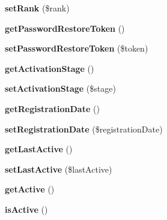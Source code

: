 \begin{DoxyCompactItemize}
\item 
\hypertarget{classUser_a1e1d45603c3b2e91b225e26f3f3f3c20}{
{\bfseries setRank} (\$rank)}
\label{classUser_a1e1d45603c3b2e91b225e26f3f3f3c20}

\item 
\hypertarget{classUser_ab4cbe8a5b71b12a8d712e90e00e38bbe}{
{\bfseries getPasswordRestoreToken} ()}
\label{classUser_ab4cbe8a5b71b12a8d712e90e00e38bbe}

\item 
\hypertarget{classUser_afe28ad4e0c352b5dd96cc15637a1fc16}{
{\bfseries setPasswordRestoreToken} (\$token)}
\label{classUser_afe28ad4e0c352b5dd96cc15637a1fc16}

\item 
\hypertarget{classUser_ae4495a601d73d7ef5d8b200e108dcffc}{
{\bfseries getActivationStage} ()}
\label{classUser_ae4495a601d73d7ef5d8b200e108dcffc}

\item 
\hypertarget{classUser_a0a873176674a02ad6bfbee3acdcd5505}{
{\bfseries setActivationStage} (\$stage)}
\label{classUser_a0a873176674a02ad6bfbee3acdcd5505}

\item 
\hypertarget{classUser_a846956e5cc52189c2f08639895385850}{
{\bfseries getRegistrationDate} ()}
\label{classUser_a846956e5cc52189c2f08639895385850}

\item 
\hypertarget{classUser_a2b691fc0aa620efb3f95899960c2930d}{
{\bfseries setRegistrationDate} (\$registrationDate)}
\label{classUser_a2b691fc0aa620efb3f95899960c2930d}

\item 
\hypertarget{classUser_a48731d70a147771c026452515017e6fd}{
{\bfseries getLastActive} ()}
\label{classUser_a48731d70a147771c026452515017e6fd}

\item 
\hypertarget{classUser_ac2e60288b023a63c6fadb654d8fb7324}{
{\bfseries setLastActive} (\$lastActive)}
\label{classUser_ac2e60288b023a63c6fadb654d8fb7324}

\item 
\hypertarget{classUser_ab926b178a27f9a97835a532379eb0111}{
{\bfseries getActive} ()}
\label{classUser_ab926b178a27f9a97835a532379eb0111}

\item 
\hypertarget{classUser_aa5f436b75f1a6d0a96377ae5ecc67c22}{
{\bfseries isActive} ()}
\label{classUser_aa5f436b75f1a6d0a96377ae5ecc67c22}

\end{DoxyCompactItemize}
